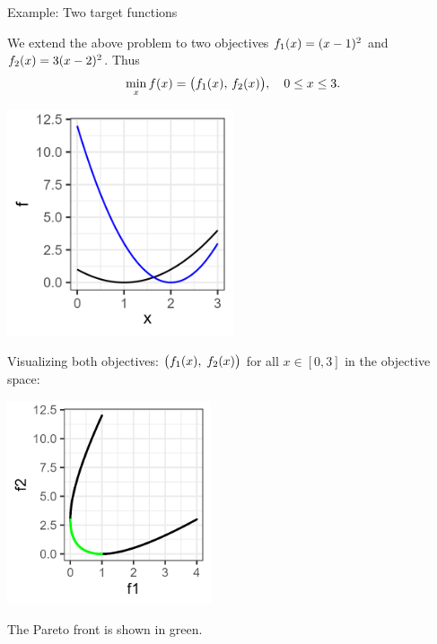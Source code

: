 \documentclass[11pt,compress,t,notes=noshow,xcolor=table]{beamer}
\begin{document}
\begin{vbframe}{Example: Two target functions}

We extend the above problem to two objectives 
\(f_1(x) = (x - 1)^2\) 
and 
\(f_2(x) = 3(x - 2)^2\). Thus
\[
  \min_{x} f(x) 
    = \bigl(f_1(x),\, f_2(x)\bigr),
  \quad 0 \le x \le 3.
\]

\begin{center}
\includegraphics[width=0.5\textwidth]{slides/11-multicrit/figure_man/graph2.png}
\end{center}

\framebreak

Visualizing both objectives:
$\bigl(f_1(x), \;f_2(x)\bigr)
$
for all \(x \in [0,3]\) in the objective space:

\begin{center}
\includegraphics[width=0.45\textwidth]{slides/11-multicrit/figure_man/graph3.png}
\end{center}

The Pareto front is shown in green. 

\end{vbframe}
\end{document}
